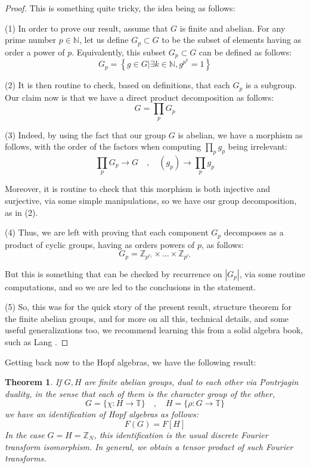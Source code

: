 \documentclass[12pt]{amsbook}
\newtheorem{theorem}{Theorem}[chapter]
\begin{document}
\begin{proof}
This is something quite tricky, the idea being as follows:

\medskip

(1) In order to prove our result, assume that $G$ is finite and abelian. For any prime number $p\in\mathbb N$, let us define $G_p\subset G$ to be the subset of elements having as order a power of $p$. Equivalently, this subset $G_p\subset G$ can be defined as follows:
$$G_p=\left\{g\in G\Big|\exists k\in\mathbb N,g^{p^k}=1\right\}$$

(2) It is then routine to check, based on definitions, that each $G_p$ is a subgroup. Our claim now is that we have a direct product decomposition as follows:
$$G=\prod_pG_p$$

(3) Indeed, by using the fact that our group $G$ is abelian, we have a morphism as follows, with the order of the factors when computing $\prod_pg_p$ being irrelevant:
$$\prod_pG_p\to G\quad,\quad (g_p)\to\prod_pg_p$$

Moreover, it is routine to check that this morphism is both injective and surjective, via some simple manipulations, so we have our group decomposition, as in (2).

\medskip

(4) Thus, we are left with proving that each component $G_p$ decomposes as a product of cyclic groups, having as orders powers of $p$, as follows:
$$G_p=\mathbb Z_{p^{r_1}}\times\ldots\times\mathbb Z_{p^{r_s}}$$

But this is something that can be checked by recurrence on $|G_p|$, via some routine computations, and so we are led to the conclusions in the statement.

\medskip

(5) So, this was for the quick story of the present result, structure theorem for the finite abelian groups, and for more on all this, technical details, and some useful generalizations too, we recommend learning this from a solid algebra book, such as Lang \cite{lng}.
\end{proof}

Getting back now to the Hopf algebras, we have the following result:


\begin{theorem}
If $G,H$ are finite abelian groups, dual to each other via Pontrjagin duality, in the sense that each of them is the character group of the other,
$$G=\big\{\chi:H\to\mathbb T\big\}\quad,\quad H=\big\{\rho:G\to\mathbb T\big\}$$
we have an identification of Hopf algebras as follows:
$$F(G)=F[H]$$
In the case $G=H=\mathbb Z_N$, this identification is the usual discrete Fourier transform isomorphism. In general, we obtain a tensor product of such Fourier transforms.
\end{theorem}
\end{document}
